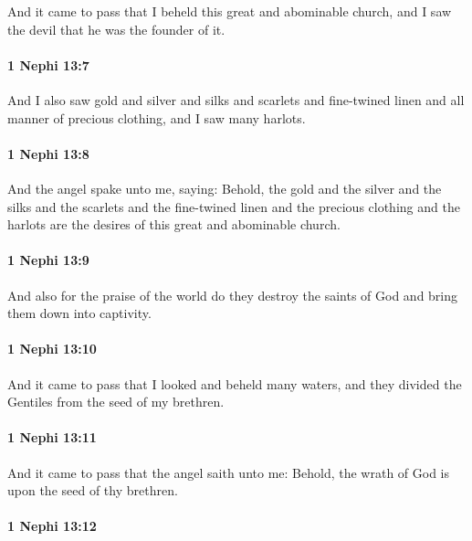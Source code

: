 			And it came to pass that I beheld this great and abominable church,
			and I saw the devil that he was the founder of it.

		\paragraph{1 Nephi 13:7} %
			\label{1NEPHI-13-7}

			And I also saw gold and silver and silks and scarlets
			and fine-twined linen and all manner of precious clothing,
			and I saw many harlots.

		\paragraph{1 Nephi 13:8} %
			\label{1NEPHI-13-8}

			And the angel spake unto me, saying:
			Behold, the gold and the silver and the silks and the scarlets
			and the fine-twined linen and the precious clothing and the harlots
			are the desires of this great and abominable church.

		\paragraph{1 Nephi 13:9} %
			\label{1NEPHI-13-9}

			And also for the praise of the world do they destroy the saints of God
			and bring them down into captivity.

		\paragraph{1 Nephi 13:10} %
			\label{1NEPHI-13-10}

			And it came to pass that I looked and beheld many waters,
			and they divided the Gentiles from the seed of my brethren.

		\paragraph{1 Nephi 13:11} %
			\label{1NEPHI-13-11}

			And it came to pass that the angel saith unto me:
			Behold, the wrath of God is upon the seed of thy brethren.

		\paragraph{1 Nephi 13:12} %
			\label{1NEPHI-13-12}

